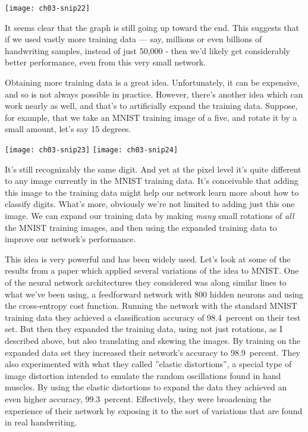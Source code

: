 \begin{marginfigure}
    \texttt{[image: ch03-snip22]}
    \end{marginfigure}

It seems clear that the graph is still going up toward the end. This suggests that if we used vastly more training data --- say, millions or even billions of handwriting samples, instead of just 50,000 - then we'd likely get considerably better performance, even from this very small network.

Obtaining more training data is a great idea. Unfortunately, it can be expensive, and so is not always possible in practice. However, there's another idea which can work nearly as well, and that's to artificially expand the training data. Suppose, for example, that we take an MNIST training image of a five, and rotate it by a small amount, let's say 15 degrees.
\begin{marginfigure}
    \texttt{[image: ch03-snip23]}
    \texttt{[image: ch03-snip24]}
    \end{marginfigure}
It's still recognizably the same digit. And yet at the pixel level it's quite different to any image currently in the MNIST training data. It's conceivable that adding this image to the training data might help our network learn more about how to classify digits. What's more, obviously we're not limited to adding just this one image. We can expand our training data by making \textit{many} small rotations of \textit{all} the MNIST training images, and then using the expanded training data to improve our network's performance.

This idea is very powerful and has been widely used. Let's look at some of the results from a paper
\cite{Simard2003} which applied several variations of the idea to MNIST. One of the neural network architectures they considered was along similar lines to what we've been using, a feedforward network with 800 hidden neurons and using the cross-entropy cost function. Running the network with the standard MNIST training data they achieved a classification accuracy of 98.4~percent on their test set. But then they expanded the training data, using not just rotations, as I described above, but also translating and skewing the images. By training on the expanded data set they increased their network's accuracy to 98.9~percent. They also experimented with what they called ''elastic distortions'', a special type of image distortion intended to emulate the random oscillations found in hand muscles. By using the elastic distortions to expand the data they achieved an even higher accuracy, 99.3~percent. Effectively, they were broadening the experience of their network by exposing it to the sort of variations that are found in real handwriting.


